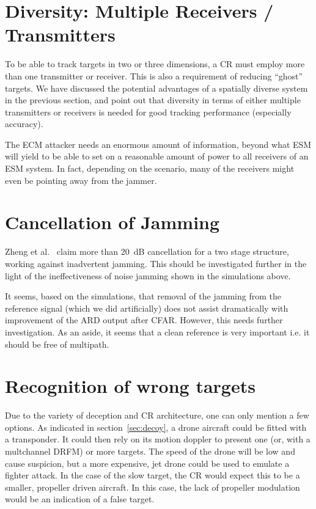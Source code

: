 \documentclass[english, 12pt]{report}
\begin{document}
\section{Diversity: Multiple Receivers / Transmitters}

To be able to track targets in two or three dimensions, a CR must employ more than one transmitter or receiver. This is also a requirement of reducing ``ghost'' targets. We have discussed the potential advantages of a spatially diverse system in the previous section, and point out that diversity in terms of either multiple transmitters or receivers is needed for good tracking performance (especially accuracy).

The ECM attacker needs an enormous amount of information, beyond what ESM will yield to be able to set on a reasonable amount of power to all receivers of an ESM system. In fact, depending on the scenario, many of the receivers might even be pointing away from the jammer.

\section{Cancellation of Jamming}

Zheng et al.~\cite{zheng:08} claim more than 20~dB cancellation for a two stage structure, working against inadvertent jamming. This should be investigated further in the light of the ineffectiveness of noise jamming shown in the simulations above.

It seems, based on the simulations, that removal of the jamming from the reference signal (which we did artificially) does not assist dramatically with improvement of the ARD output after CFAR. However, this needs further investigation. As an aside, it seems that a clean reference is very important i.e. it should be free of multipath.




\section{Recognition of wrong targets}

Due to the variety of deception and CR architecture, one can only mention a few options. As indicated in section~\ref{sec:decoy}, a drone aircraft could be fitted with a transponder. It could then rely on its motion doppler to present one (or, with a multchannel DRFM) or more targets. The speed of the drone will be low and cause suspicion, but a more expensive, jet drone could be used to emulate a fighter attack. In the case of the slow target, the CR would expect this to be a smaller, propeller driven aircraft. In this case, the lack of propeller modulation would be an indication of a false target.
\end{document}
